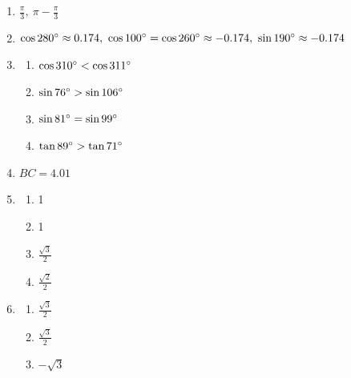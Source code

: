 \documentclass{article}
\begin{document}
\begin{enumerate}
\begin{enumerate}
	\item $\sin{(x)} = \frac{1}{2}$
	
	\end{enumerate}

\item $\frac{\pi}{3}, \ \pi - \frac{\pi}{3}$

\item $\cos{280 \degree} \approx 0.174, \ \cos{100 \degree} = \cos{260 \degree} \approx -0.174, \ \sin{190 \degree} \approx -0.174$

\item

	\begin{enumerate}
	
	\item $\cos{310\degree} < \cos{311\degree}$
	
	\item $\sin{76\degree} > \sin{106\degree}$
	
	\item $\sin{81\degree} = \sin{99\degree}$
	
	\item $\tan{89\degree} > \tan{71\degree}$
	
	\end{enumerate}
	
\item $BC = 4.01$

\item

	\begin{enumerate}
	
	\item 1
	
	\item 1
	
	\item $\frac{\sqrt{3}}{2}$
	
	\item $\frac{\sqrt{2}}{2}$
	
	\end{enumerate}
	
\item
	
	\begin{enumerate}
	
	\item $\frac{\sqrt{3}}{2}$
	
	\item $\frac{\sqrt{3}}{2}$
	
	\item $-\sqrt{3}$
	

\end{enumerate}
\end{enumerate}
\end{document}

